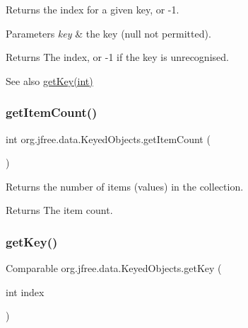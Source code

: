 Returns the index for a given key, or {\ttfamily -\/1}.


\begin{DoxyParams}{Parameters}
{\em key} & the key ({\ttfamily null} not permitted).\\
\hline
\end{DoxyParams}
\begin{DoxyReturn}{Returns}
The index, or {\ttfamily -\/1} if the key is unrecognised.
\end{DoxyReturn}
\begin{DoxySeeAlso}{See also}
\mbox{\hyperlink{classorg_1_1jfree_1_1data_1_1_keyed_objects_a345ba3d51a940d7e885747a0da54e04e}{get\+Key(int)}} 
\end{DoxySeeAlso}
\mbox{\label{classorg_1_1jfree_1_1data_1_1_keyed_objects_a1815c9c38128966a1a51cc58ef96fb59}} 
\subsubsection{\texorpdfstring{get\+Item\+Count()}{getItemCount()}}
{\footnotesize\ttfamily int org.\+jfree.\+data.\+Keyed\+Objects.\+get\+Item\+Count (\begin{DoxyParamCaption}{ }\end{DoxyParamCaption})}

Returns the number of items (values) in the collection.

\begin{DoxyReturn}{Returns}
The item count. 
\end{DoxyReturn}
\mbox{\label{classorg_1_1jfree_1_1data_1_1_keyed_objects_a345ba3d51a940d7e885747a0da54e04e}} 
\subsubsection{\texorpdfstring{get\+Key()}{getKey()}}
{\footnotesize\ttfamily Comparable org.\+jfree.\+data.\+Keyed\+Objects.\+get\+Key (\begin{DoxyParamCaption}\item[{int}]{index }\end{DoxyParamCaption})}

